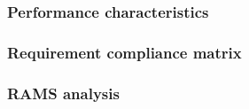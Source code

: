 \subsubsection{Performance characteristics} \label{sec:perf}


\subsubsection{Requirement compliance matrix} \label{sec:ComMat}


\subsubsection{RAMS analysis} \label{sec:rams}







